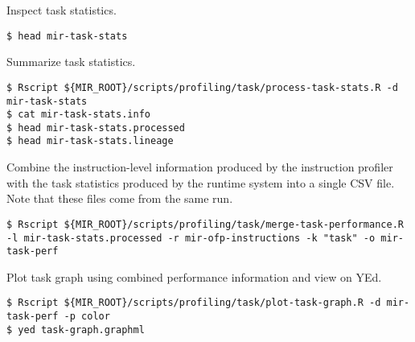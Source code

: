 \documentclass[11pt,a4paper]{article}
\begin{document}
Inspect task statistics.

\begin{lstlisting}[style=MyInputStyle]
$ head mir-task-stats
\end{lstlisting}

Summarize task statistics.

\begin{lstlisting}[style=MyInputStyle]
$ Rscript ${MIR_ROOT}/scripts/profiling/task/process-task-stats.R -d mir-task-stats
$ cat mir-task-stats.info
$ head mir-task-stats.processed
$ head mir-task-stats.lineage
\end{lstlisting}

Combine the instruction-level information produced by the instruction profiler with the task statistics produced by the runtime system into a single CSV file. Note that these files come from the same run.

\begin{lstlisting}[style=MyInputStyle]
$ Rscript ${MIR_ROOT}/scripts/profiling/task/merge-task-performance.R -l mir-task-stats.processed -r mir-ofp-instructions -k "task" -o mir-task-perf
\end{lstlisting}

Plot task graph using combined performance information and view on YEd.

\begin{lstlisting}[style=MyInputStyle]
$ Rscript ${MIR_ROOT}/scripts/profiling/task/plot-task-graph.R -d mir-task-perf -p color
$ yed task-graph.graphml
\end{lstlisting}
\end{document}

